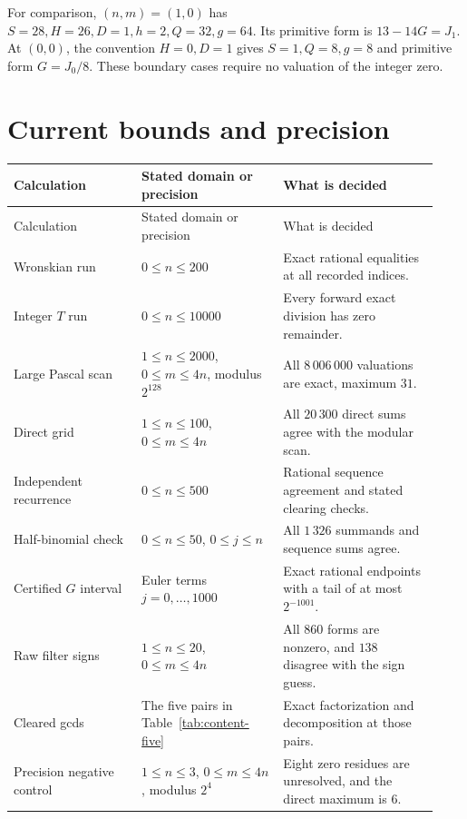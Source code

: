 For comparison, $(n,m)=(1,0)$ has $S=28,H=26,D=1,h=2,Q=32,g=64$. Its primitive form is $13-14G=J_1$. At $(0,0)$, the convention $H=0,D=1$ gives $S=1,Q=8,g=8$ and primitive form $G=J_0/8$. These boundary cases require no valuation of the integer zero.

\section{Current bounds and precision}

\begin{longtable}{@{}p{0.28\linewidth}p{0.31\linewidth}p{0.34\linewidth}@{}}
\toprule
Calculation & Stated domain or precision & What is decided\\
\midrule
\endfirsthead
\toprule
Calculation & Stated domain or precision & What is decided\\
\midrule
\endhead
\bottomrule
\endfoot
Wronskian run & $0\leq n\leq200$ & Exact rational equalities at all recorded indices.\\[5pt]
Integer $T$ run & $0\leq n\leq10000$ & Every forward exact division has zero remainder.\\[5pt]
Large Pascal scan & $1\leq n\leq2000$, $0\leq m\leq4n$, modulus $2^{128}$ & All $8\,006\,000$ valuations are exact, maximum $31$.\\[5pt]
Direct grid & $1\leq n\leq100$, $0\leq m\leq4n$ & All $20\,300$ direct sums agree with the modular scan.\\[5pt]
Independent recurrence & $0\leq n\leq500$ & Rational sequence agreement and stated clearing checks.\\[5pt]
Half-binomial check & $0\leq n\leq50$, $0\leq j\leq n$ & All $1\,326$ summands and sequence sums agree.\\[5pt]
Certified $G$ interval & Euler terms $j=0,\ldots,1000$ & Exact rational endpoints with a tail of at most $2^{-1001}$.\\[5pt]
Raw filter signs & $1\leq n\leq20$, $0\leq m\leq4n$ & All $860$ forms are nonzero, and $138$ disagree with the sign guess.\\[5pt]
Cleared gcds & The five pairs in Table~\ref{tab:content-five} & Exact factorization and decomposition at those pairs.\\[5pt]
Precision negative control & $1\leq n\leq3$, $0\leq m\leq4n$, modulus $2^4$ & Eight zero residues are unresolved, and the direct maximum is $6$.\\
\end{longtable}

